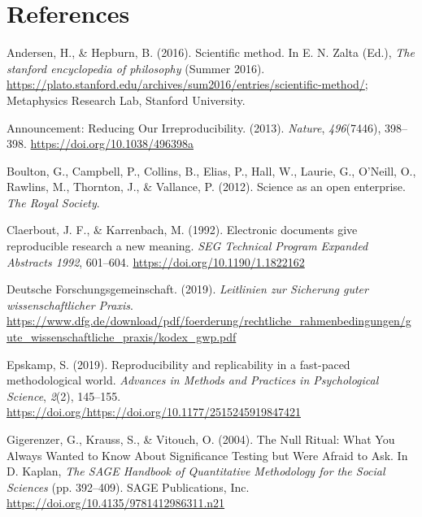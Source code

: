 \documentclass[12pt,a4paper,]{article}
\begin{document}
\hypertarget{references}{%
\section*{References}\label{references}}

\hypertarget{refs}{}
\leavevmode\hypertarget{ref-andersonScientificMethod2016}{}%
Andersen, H., \& Hepburn, B. (2016). Scientific method. In E. N. Zalta (Ed.), \emph{The stanford encyclopedia of philosophy} (Summer 2016). \url{https://plato.stanford.edu/archives/sum2016/entries/scientific-method/}; Metaphysics Research Lab, Stanford University.

\leavevmode\hypertarget{ref-AnnouncementReducingOur2013}{}%
Announcement: Reducing Our Irreproducibility. (2013). \emph{Nature}, \emph{496}(7446), 398--398. \url{https://doi.org/10.1038/496398a}

\leavevmode\hypertarget{ref-boultonScienceOpenEnterprise2012}{}%
Boulton, G., Campbell, P., Collins, B., Elias, P., Hall, W., Laurie, G., O'Neill, O., Rawlins, M., Thornton, J., \& Vallance, P. (2012). Science as an open enterprise. \emph{The Royal Society}.

\leavevmode\hypertarget{ref-claerboutElectronicDocumentsGive1992}{}%
Claerbout, J. F., \& Karrenbach, M. (1992). Electronic documents give reproducible research a new meaning. \emph{SEG Technical Program Expanded Abstracts 1992}, 601--604. \url{https://doi.org/10.1190/1.1822162}

\leavevmode\hypertarget{ref-dfg2019}{}%
Deutsche Forschungsgemeinschaft. (2019). \emph{Leitlinien zur Sicherung guter wissenschaftlicher Praxis}. \url{https://www.dfg.de/download/pdf/foerderung/rechtliche_rahmenbedingungen/gute_wissenschaftliche_praxis/kodex_gwp.pdf}

\leavevmode\hypertarget{ref-epskamp2019rep}{}%
Epskamp, S. (2019). Reproducibility and replicability in a fast-paced methodological world. \emph{Advances in Methods and Practices in Psychological Science}, \emph{2}(2), 145--155. \url{https://doi.org/https://doi.org/10.1177/2515245919847421}

\leavevmode\hypertarget{ref-gigerenzerNullRitualWhat2004}{}%
Gigerenzer, G., Krauss, S., \& Vitouch, O. (2004). The Null Ritual: What You Always Wanted to Know About Significance Testing but Were Afraid to Ask. In D. Kaplan, \emph{The SAGE Handbook of Quantitative Methodology for the Social Sciences} (pp. 392--409). SAGE Publications, Inc. \url{https://doi.org/10.4135/9781412986311.n21}
\end{document}
